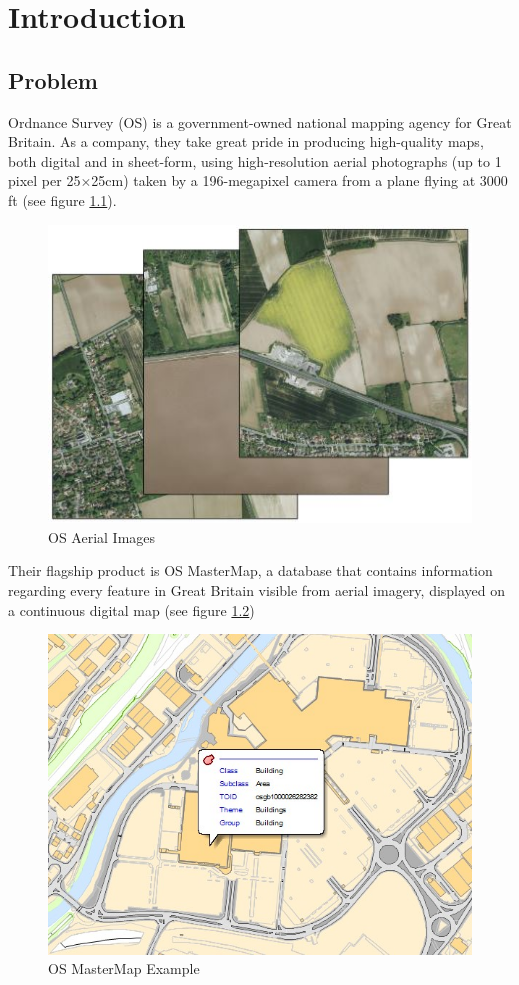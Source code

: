\chapter{Introduction} \label{chapter:intro}
\section{Problem}
Ordnance Survey (OS) is a government-owned national mapping agency for Great Britain. As a company, they take great pride in producing high-quality maps, both digital and in sheet-form, using high-resolution aerial photographs (up to 1 pixel per 25$\times$25cm) taken by a 196-megapixel camera from a plane flying at 3000 ft \citep{nelson_2014} (see figure \ref{fig:aerial}).

\begin{figure}[H]
    \centering
    \includegraphics{figs/1/aerial}
    \caption{OS Aerial Images}
    \label{fig:aerial}
\end{figure}

Their flagship product is OS MasterMap, a database that contains information regarding every feature in Great Britain visible from aerial imagery, displayed on a continuous digital map (see figure \ref{fig:mastermap})

\begin{figure}[H]
    \centering
    \includegraphics[width=\textwidth]{figs/1/mastermap}
    \caption{OS MasterMap Example}
    \label{fig:mastermap}
\end{figure}

